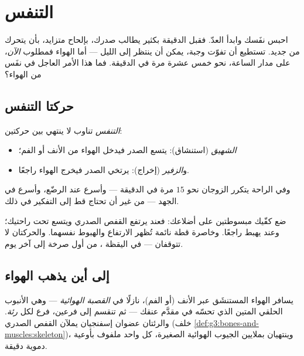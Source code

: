 \chapter{التنفس}\label{ch:g4:breathing}

احبس نفَسك وابدأ العدّ. فقبل الدقيقة بكثير يطالب صدرك، بإلحاح
متزايد، بأن يتحرك من جديد. تستطيع أن تفوّت وجبة،  يمكن أن
ينتظر إلى الليل --- أما الهواء فمطلوب \emph{الآن}، على مدار
الساعة، نحو خمس عشرة مرة في الدقيقة. فما هذا الأمر العاجل في نفَس
من الهواء؟

\section{حركتا التنفس}

\begin{definition}\label{def:g4:breathing:movements}
\emph{التنفس} تناوب لا ينتهي بين حركتين:
\begin{itemize}
  \item \emph{الشهيق} (استنشاق): يتسع الصدر فيدخل
        الهواء من الأنف أو الفم؛
  \item و\emph{الزفير} (إخراج): يرتخي الصدر فيخرج
        الهواء راجعًا.
\end{itemize}
وفي الراحة يتكرر الزوجان نحو $15$ مرة في الدقيقة --- وأسرع عند
الرضّع، وأسرع في الجهد --- من غير أن تحتاج قط إلى التفكير في ذلك.
\end{definition}

\begin{example}\label{ex:g4:breathing:watch}
ضع كفّيك مبسوطتين على أضلاعك: فعند  يرتفع القفص الصدري
ويتسع تحت راحتيك؛ وعند  يهبط راجعًا. وخاصرة قطة نائمة تُظهر
الارتفاع والهبوط نفسهما. والحركتان لا تتوقفان --- في اليقظة
، من أول صرخة إلى آخر يوم.
\end{example}

\section{إلى أين يذهب الهواء}

\begin{definition}\label{def:g4:breathing:organs}
يسافر الهواء المستنشَق عبر الأنف (أو الفم)، نازلًا في
\emph{القصبة الهوائية} --- وهي الأنبوب الحلقي
المتين الذي تحسّه في مقدَّم عنقك --- ثم تنقسم إلى فرعين، فرع لكل
\emph{رئة}. والرئتان عضوان إسفنجيان يملآن القفص الصدري
(خلف  \cref{def:g3:bones-and-muscles:skeleton})، وينتهيان
بملايين الجيوب الهوائية الصغيرة، كل واحد ملفوف بأوعية دموية دقيقة.
\end{definition}

